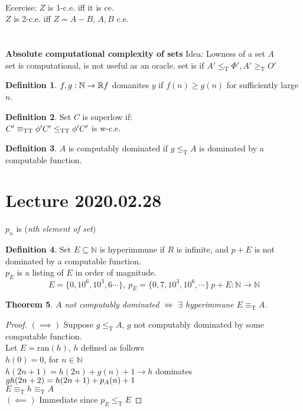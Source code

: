 \documentclass{article}
\let\ddd\cdots
\newcommand{\R}{\mathbb{R}}
\newcommand{\N}{\mathbb{N}}
\newcommand{\tr}{\leq_\mathrm{T}}
\newcommand{\teq}{\equiv_\mathrm{T}}
\newcommand{\ran}{\mathrm{ran}}
\newtheorem{theorem}{Theorem}[section]
\theoremstyle{definition}
\newtheorem{definition}[theorem]{Definition}
\theoremstyle{remark}
\theoremstyle{example}
\begin{document}
	\\
	Ecercise: $Z$ is 1-c.e. iff it is ce.\\
	$Z$ is 2-c.e. iff $Z=A-B$, $A,B$ c.e.\\
	\\
	\\
	\textbf{Absolute computational complexity of sets}
	Idea: Lowness of a set $A$\\
	set is computational, is not useful as an oracle. set is if $A' \tr \Phi', A' \geq_\mathrm{T} O'$\\
	\begin{definition}
		$f,g:\N\to\R\\
		f$ domanites $y$ if $f(n) \geq g(n)$ for sufficiently large $n$.
	\end{definition}

	\begin{definition}
		Set $C$ is superlow if:\\
		$C' \equiv_\mathrm{TT} \phi'\\
		C' \leq_\mathrm{TT} \phi'\\
		C'$ is w-c.e.
	\end{definition}

	\begin{definition}
		$A$ is computably dominated if $g \tr A$ is dominated by a computable function.
	\end{definition}

	\section*{Lecture 2020.02.28}
	$p_n$ is (\textit{nth element of set})
	\begin{definition}
		Set $E \subseteq \N$ is hyperimmune if $R$ is infinite, and $p+E$ is not dominated by a computable function.\\
		$p_E$ is a listing of $E$ in order of magnitude.
		\[E=\{0,10^6,10^3,6\ddd\},\ p_E=\{0,7,10^3,10^6,\ddd\}\ p+E:\N \to \N\]
	\end{definition}
	\begin{theorem}
		$A$ not computably dominated $\iff$ $\exists$ hyperimmune $E \teq A$.
	\end{theorem}
	\begin{proof}
		$(\implies)$ Suppose $g \tr A$, $g$ not computably dominated by some computable function.\\
		Let $E=\ran(h)$, $h$ defined as follows\\
		$h(0)=0$, for $n \in \N$\\
		$h(2n+1)=h(2n)+g(n)+1 \to h$ dominates $g\\
		h(2n+2) = h(2n+1) + p_A(n) + 1$\\
		$E \teq h \teq A$\\
		$(\impliedby)$ Immediate since $p_E \tr E$ 
	\end{proof}
\end{document}
